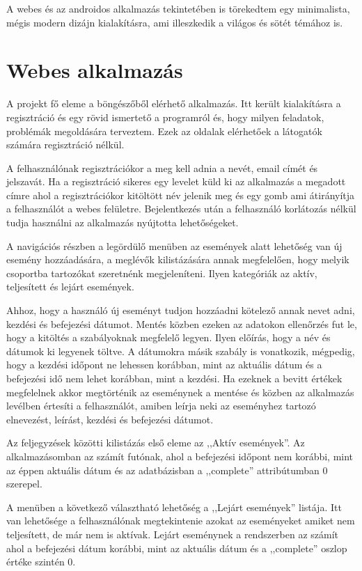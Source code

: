 \documentclass[
]{thesis-ekf}
\theoremstyle{definition}
\theoremstyle{remark}
\begin{document}
A webes és az androidos alkalmazás tekintetében is törekedtem egy minimalista, mégis modern dizájn kialakításra, ami illeszkedik a világos és sötét témához is.
\section{Webes alkalmazás}
A projekt fő eleme a böngészőből elérhető alkalmazás. Itt került kialakításra a regisztráció és egy rövid ismertető a programról és, hogy milyen feladatok, problémák megoldására terveztem. Ezek az oldalak elérhetőek a látogatók számára regisztráció nélkül. 

A felhasználónak regisztrációkor a meg kell adnia a nevét, email címét és jelszavát. Ha a regisztráció sikeres egy levelet küld ki az alkalmazás a megadott címre ahol a regisztrációkor kitöltött név jelenik meg és egy gomb ami átirányítja a felhasználót a webes felületre. Bejelentkezés után a felhasználó korlátozás nélkül tudja használni az alkalmazás nyújtotta lehetőségeket. 

A navigációs részben a legördülő menüben az események alatt lehetőség van új esemény hozzáadására, a meglévők kilistázására annak megfelelően, hogy melyik csoportba tartozókat szeretnénk megjeleníteni. Ilyen kategóriák az aktív, teljesített és lejárt események. 

Ahhoz, hogy a használó új eseményt tudjon hozzáadni kötelező annak nevet adni, kezdési és befejezési dátumot. Mentés közben ezeken az adatokon ellenőrzés fut le, hogy a kitöltés a szabályoknak megfelelő legyen. Ilyen előírás, hogy a név és dátumok ki legyenek töltve. A dátumokra másik szabály is vonatkozik, mégpedig, hogy a kezdési időpont ne lehessen korábban, mint az aktuális dátum és a befejezési idő nem lehet korábban, mint a kezdési. Ha ezeknek a bevitt értékek megfelelnek akkor megtörténik az eseménynek a mentése és közben az alkalmazás levélben értesíti a felhasználót, amiben leírja neki az eseményhez tartozó elnevezést, leírást, kezdési és befejezési dátumot. 

Az feljegyzések közötti kilistázás első eleme az ,,Aktív események''. Az alkalmazásomban az számít futónak, ahol a befejezési időpont nem korábbi, mint az éppen aktuális dátum és az adatbázisban a ,,complete''  attribútumban 0 szerepel.

A menüben a következő választható lehetőség a ,,Lejárt események'' listája. Itt van lehetősége a felhasználónak megtekintenie azokat az eseményeket amiket nem teljesített, de már nem is aktívak. Lejárt eseménynek a rendszerben az számít ahol a befejezési dátum korábbi, mint az aktuális dátum és a ,,complete'' oszlop értéke szintén 0. 
\end{document}
